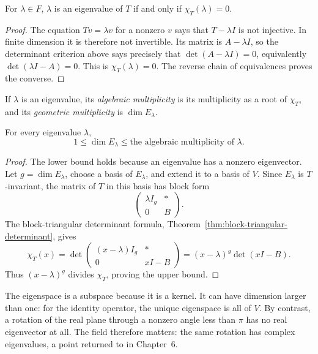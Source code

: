 \begin{proposition}
For \(\lambda\in F\), \(\lambda\) is an eigenvalue of \(T\) if and only if
\(\chi_T(\lambda)=0\).
\end{proposition}
\begin{proof}
The equation \(Tv=\lambda v\) for a nonzero \(v\) says that
\(T-\lambda I\) is not injective. In finite dimension it is therefore not
invertible. Its matrix is \(A-\lambda I\), so the determinant criterion
above says precisely that \(\det(A-\lambda I)=0\), equivalently
\(\det(\lambda I-A)=0\). This is \(\chi_T(\lambda)=0\). The reverse chain
of equivalences proves the converse.
\end{proof}

\begin{definition}
If \(\lambda\) is an eigenvalue, its \emph{algebraic multiplicity} is its
multiplicity as a root of \(\chi_T\), and its \emph{geometric multiplicity}
is \(\dim E_\lambda\).
\end{definition}

\begin{proposition}
\label{prop:eigenvalue-multiplicities}
For every eigenvalue \(\lambda\),
\[
1\leq\dim E_\lambda\leq
\text{the algebraic multiplicity of }\lambda.
\]
\end{proposition}
\begin{proof}
The lower bound holds because an eigenvalue has a nonzero eigenvector.
Let \(g=\dim E_\lambda\), choose a basis of \(E_\lambda\), and extend it to
a basis of \(V\).  Since \(E_\lambda\) is \(T\)-invariant, the matrix of
\(T\) in this basis has block form
\[
\begin{pmatrix}\lambda I_g&*\\0&B\end{pmatrix}.
\]
The block-triangular determinant formula,
Theorem~\ref{thm:block-triangular-determinant}, gives
\[
\chi_T(x)=\det\begin{pmatrix}
(x-\lambda)I_g&*\\0&xI-B
\end{pmatrix}
=(x-\lambda)^g\det(xI-B).
\]
Thus \((x-\lambda)^g\) divides \(\chi_T\), proving the upper bound.
\end{proof}

The eigenspace is a subspace because it is a kernel. It can have dimension
larger than one: for the identity operator, the unique eigenspace is all of
\(V\). By contrast, a rotation of the real plane through a nonzero angle less
than \(\pi\) has no real eigenvector at all. The field therefore matters:
the same rotation has complex eigenvalues, a point returned to in Chapter~6.

